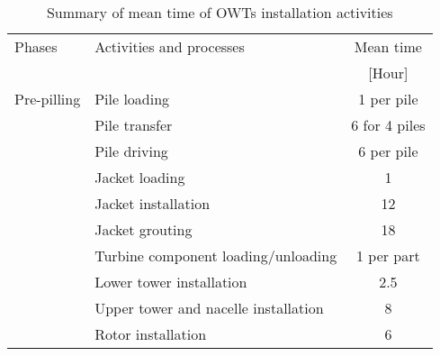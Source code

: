 
\begin{table}
\label{tab:times}

\begin{tabular}{llc}
\hline 
Phases & Activities and processes & Mean time \\ 
& & [Hour] \\ 
\hline 
Pre-pilling & Pile loading & 1 per pile \\
 & Pile transfer & 6 for 4 piles\\
 & Pile driving & 6 per pile\\
\hline
 & Jacket loading & 1\\
 & Jacket installation & 12\\
 & Jacket grouting & 18\\
 & Turbine component loading/unloading & 1 per part\\
 & Lower tower installation & 2.5\\
 & Upper tower and nacelle installation & 8\\
 & Rotor installation & 6\\
\hline 
\end{tabular} 

\caption{Summary of mean time of OWTs installation activities}
\end{table}
